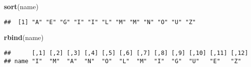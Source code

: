 \documentclass[
]{article}
\newenvironment{Shaded}{\begin{snugshade}}{\end{snugshade}}
\newcommand{\KeywordTok}[1]{\textcolor[rgb]{0.13,0.29,0.53}{\textbf{#1}}}
\newcommand{\NormalTok}[1]{#1}
\begin{document}
\begin{Shaded}
\begin{Highlighting}[]
\KeywordTok{sort}\NormalTok{(name)}
\end{Highlighting}
\end{Shaded}

\begin{verbatim}
##  [1] "A" "E" "G" "I" "I" "L" "M" "M" "N" "O" "U" "Z"
\end{verbatim}

\begin{Shaded}
\begin{Highlighting}[]
\KeywordTok{rbind}\NormalTok{(name)}
\end{Highlighting}
\end{Shaded}

\begin{verbatim}
##      [,1] [,2] [,3] [,4] [,5] [,6] [,7] [,8] [,9] [,10] [,11] [,12]
## name "I"  "M"  "A"  "N"  "O"  "L"  "M"  "I"  "G"  "U"   "E"   "Z"
\end{verbatim}
\end{document}
